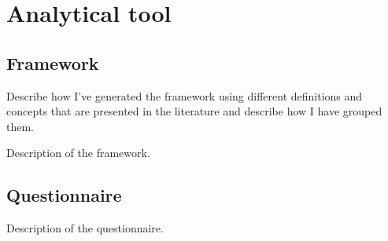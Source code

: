 
\chapter{Analytical tool} %

\label{Chapter4} %




\section{Framework}


Describe how I’ve generated the framework using different definitions and concepts that are presented in the literature and describe how I have grouped them.

Description of the framework.

\section{Questionnaire}
Description of the questionnaire.

